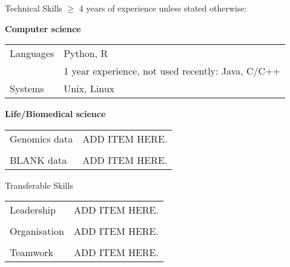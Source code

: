 \documentclass{resume} %
\newlength{\pcolleftwdth} %
\begin{document}
\begin{rSection}{Technical Skills}
\vspace{-0.3em} $\geq$ 4 years of experience unless stated otherwise:

{\bf Computer science}\smallskip\\
\begin{tabular}{@{}li{\pcolwdth}} %
\parbox[t][][t]{\pcolleftwdth}{Languages}
    & \item Python, R \\
    & \item 1 year experience, not used recently: Java, C/C++ \smallskip\\
\parbox[t][][t]{\pcolleftwdth}{Systems}
    & \item Unix, Linux \smallskip\\
\end{tabular}\par
\ifresume %
\else %
    \pointskip
\fi

{\bf Life/Biomedical science}\smallskip\\
\begin{tabular}{@{}li{\pcolwdth}}
\parbox[t][][t]{\pcolleftwdth}{Genomics data}
    & \item ADD ITEM HERE.\\\smallskip\\
\parbox[t][][t]{\pcolleftwdth}{BLANK data}
    & \item ADD ITEM HERE.\\
\end{tabular}\par


\end{rSection}


\begin{rSection}{Transferable Skills}

\begin{tabular}{@{}li{\pcolwdth}}
\parbox[t][][t]{\pcolleftwdth}{Leadership}
    & \item ADD ITEM HERE.\\\smallskip\\
\parbox[t][][t]{\pcolleftwdth}{Organisation}
    & \item ADD ITEM HERE.\\\smallskip\\
\parbox[t][][t]{\pcolleftwdth}{Teamwork}
    & \item ADD ITEM HERE.\\
\end{tabular}\par

\end{rSection}
\end{document}
